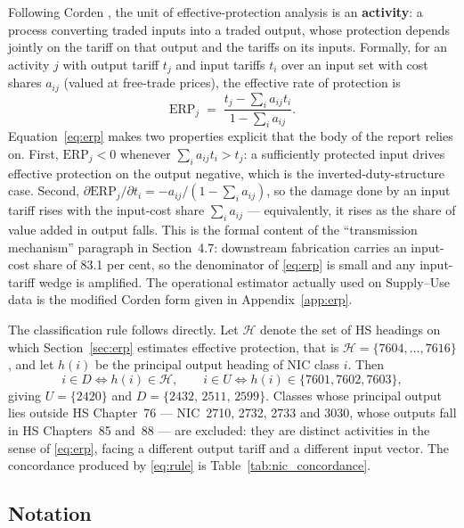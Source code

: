 \documentclass[11pt, a4paper]{article}
\numberwithin{figure}{section}
\numberwithin{table}{section}
\begin{document}
Following Corden \cite{corden1966}, the unit of effective-protection analysis is an
\textbf{activity}: a process converting traded inputs into a traded output, whose
protection depends jointly on the tariff on that output and the tariffs on its
inputs. Formally, for an activity $j$ with output tariff $t_j$ and input tariffs
$t_i$ over an input set with cost shares $a_{ij}$ (valued at free-trade prices),
the effective rate of protection is
\begin{equation}
    \mathrm{ERP}_j \;=\; \frac{t_j - \sum_i a_{ij} t_i}{1 - \sum_i a_{ij}} .
    \label{eq:erp}
\end{equation}
Equation~\eqref{eq:erp} makes two properties explicit that the body of the report
relies on. First, $\mathrm{ERP}_j < 0$ whenever $\sum_i a_{ij} t_i > t_j$: a
sufficiently protected input drives effective protection on the output negative,
which is the inverted-duty-structure case. Second,
$\partial \mathrm{ERP}_j / \partial t_i = -a_{ij}/(1 - \sum_i a_{ij})$, so the
damage done by an input tariff rises with the input-cost share $\sum_i a_{ij}$ ---
equivalently, it rises as the share of value added in output falls. This is the
formal content of the ``transmission mechanism'' paragraph in Section~4.7:
downstream fabrication carries an input-cost share of 83.1 per cent, so the
denominator of \eqref{eq:erp} is small and any input-tariff wedge is amplified.
The operational estimator actually used on Supply--Use data is the modified
Corden form given in Appendix~\ref{app:erp}.

The classification rule follows directly. Let $\mathcal{H}$ denote the set of HS
headings on which Section~\ref{sec:erp} estimates effective protection, that is
$\mathcal{H} = \{7604,\dots,7616\}$, and let $h(i)$ be the principal output
heading of NIC class $i$. Then
\begin{equation}
    i \in D \iff h(i) \in \mathcal{H},
    \qquad
    i \in U \iff h(i) \in \{7601, 7602, 7603\},
    \label{eq:rule}
\end{equation}
giving $U = \{2420\}$ and $D = \{2432,\, 2511,\, 2599\}$. Classes whose principal
output lies outside HS Chapter~76 --- NIC~2710, 2732, 2733 and 3030, whose outputs
fall in HS Chapters~85 and~88 --- are excluded: they are distinct activities in the
sense of \eqref{eq:erp}, facing a different output tariff and a different input
vector. The concordance produced by \eqref{eq:rule} is Table~\ref{tab:nic_concordance}.

\subsection{Notation}
\end{document}
